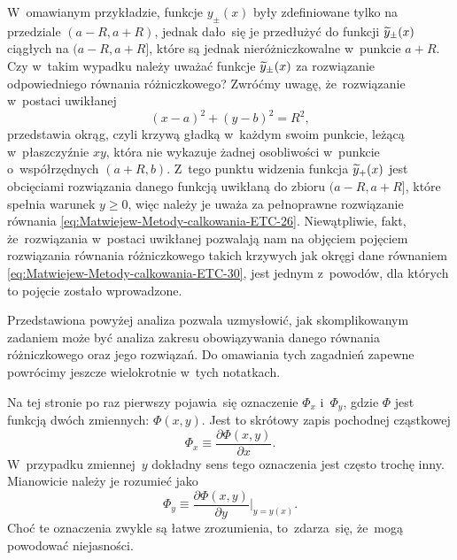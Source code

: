 \documentclass[a4paper,11pt]{article}
\numberwithin{equation}{section}
\begin{document}
W~omawianym przykładzie, funkcje $y_{ \pm }( x )$ były zdefiniowane tylko na
przedziale $( a - R, a + R )$, jednak dało~się je przedłużyć do funkcji
$\widetilde{y}_{ \pm }( x )$ ciągłych na $( a - R, a + R ]$, które są jednak
nieróżniczkowalne w~punkcie $a + R$. Czy w~takim wypadku należy uważać
funkcje $\widetilde{y}_{ \pm }( x )$ za rozwiązanie odpowiedniego równania
różniczkowego? Zwróćmy uwagę, że~rozwiązanie w~postaci uwikłanej
\begin{equation}
  \label{eq:Uwagi-do-konkrentych-stron-09}
  ( x - a )^{ 2 } + ( y - b )^{ 2 } = R^{ 2 },
\end{equation}
przedstawia okrąg, czyli krzywą gładką w~każdym swoim punkcie, leżącą
w~płaszczyźnie $xy$, która nie wykazuje żadnej osobliwości w~punkcie
o~współrzędnych $( a + R, b )$. Z~tego
punktu widzenia funkcja $\widetilde{y}_{ + }( x )$ jest obcięciami rozwiązania
danego funkcją uwikłaną do zbioru $( a - R, a + R ]$, które spełnia warunek
$y \geq 0$, więc należy je uważa za pełnoprawne rozwiązanie równania
\eqref{eq:Matwiejew-Metody-calkowania-ETC-26}. Niewątpliwie, fakt,
że~rozwiązania w~postaci uwikłanej pozwalają nam na objęciem pojęciem
rozwiązania równania różniczkowego takich krzywych jak okręgi dane równaniem
\eqref{eq:Matwiejew-Metody-calkowania-ETC-30}, jest jednym z~powodów, dla
których to pojęcie zostało wprowadzone.

Przedstawiona powyżej analiza pozwala uzmysłowić, jak skomplikowanym
zadaniem może być analiza zakresu obowiązywania danego równania
różniczkowego oraz jego rozwiązań. Do omawiania tych zagadnień zapewne
powrócimy jeszcze wielokrotnie w~tych notatkach.

\VerSpaceFour





\noindent
{} Na tej stronie po raz pierwszy pojawia~się oznaczenie $\Phi_{ x }$
i~$\Phi_{ y }$, gdzie $\Phi$ jest funkcją dwóch zmiennych:
$\Phi( x, y )$. Jest to skrótowy zapis pochodnej cząstkowej
\begin{equation}
  \label{eq:Uwagi-do-konkrentych-stron-10}
  \Phi_{ x } \equiv
  \frac{ \partial \Phi( x, y ) }{ \partial x }.
\end{equation}
W~przypadku zmiennej~$y$ dokładny sens tego oznaczenia jest często trochę
inny. Mianowicie należy je rozumieć jako
\begin{equation}
  \label{eq:Uwagi-do-konkrentych-stron-11}
  \Phi_{ y } \equiv
  \frac{ \partial \Phi( x, y ) }{ \partial y }\bigg|_{ y = y( x ) }.
\end{equation}
Choć te oznaczenia zwykle są łatwe zrozumienia, to~zdarza~się,
że~mogą powodować niejasności.
\end{document}
